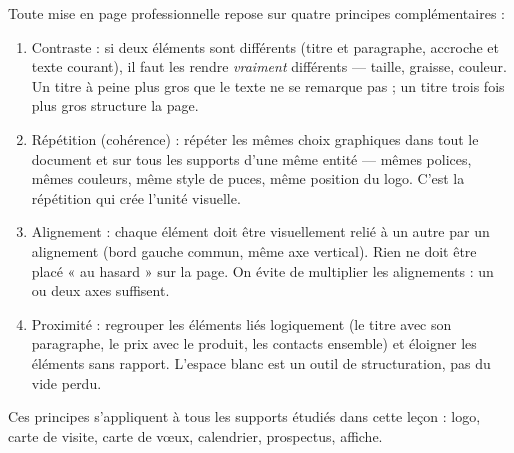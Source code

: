 \documentclass[11pt]{article}
\newcommand{\cle}[1]{{\popxbold\color{popdark}#1}}
\begin{document}
\begin{propriete}
Toute mise en page professionnelle repose sur quatre principes complémentaires :
\begin{enumerate}
  \item \cle{Contraste} : si deux éléments sont différents (titre et paragraphe, accroche et texte courant), il faut les rendre \emph{vraiment} différents — taille, graisse, couleur. Un titre à peine plus gros que le texte ne se remarque pas ; un titre trois fois plus gros structure la page.
  \item \cle{Répétition} (cohérence) : répéter les mêmes choix graphiques dans tout le document et sur tous les supports d'une même entité — mêmes polices, mêmes couleurs, même style de puces, même position du logo. C'est la répétition qui crée l'unité visuelle.
  \item \cle{Alignement} : chaque élément doit être visuellement relié à un autre par un alignement (bord gauche commun, même axe vertical). Rien ne doit être placé « au hasard » sur la page. On évite de multiplier les alignements : un ou deux axes suffisent.
  \item \cle{Proximité} : regrouper les éléments liés logiquement (le titre avec son paragraphe, le prix avec le produit, les contacts ensemble) et éloigner les éléments sans rapport. L'espace blanc est un outil de structuration, pas du vide perdu.
\end{enumerate}
Ces principes s'appliquent à tous les supports étudiés dans cette leçon : logo, carte de visite, carte de vœux, calendrier, prospectus, affiche.
\end{propriete}
\end{document}
